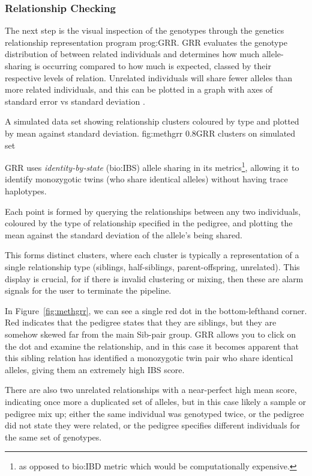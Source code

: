 \subsubsection{Relationship Checking}

The next step is the visual inspection of the genotypes through the genetics relationship representation program \gls{prog:GRR}. GRR evaluates the genotype distribution of between related individuals and determines how much allele-sharing is occurring compared to how much is expected, classed by their respective levels of relation. Unrelated individuals will share fewer alleles than more related individuals, and this can be plotted in a graph with axes of standard error vs standard deviation \cite{grr}.

{A simulated data set showing relationship clusters coloured by type and plotted by mean against standard deviation.}
{fig:methgrr}
{0.8}{GRR clusters on simulated set}

GRR uses \textit{identity-by-state} (\gls{bio:IBS}) allele sharing in its metrics\footnote{as opposed to \gls{bio:IBD} metric which would be computationally expensive.}, allowing it to identify monozygotic twins (who share identical alleles) without having trace haplotypes.

Each point is formed by querying the relationships between any two individuals, coloured by the type of relationship specified in the pedigree, and plotting the mean against the standard deviation of the allele's being shared.

This forms distinct clusters, where each cluster is typically a representation of a single relationship type (siblings, half-siblings, parent-offspring, unrelated). This display is crucial, for if there is invalid clustering or mixing, then these are alarm signals for the user to terminate the pipeline.

In Figure~\ref{fig:methgrr}, we can see a single red dot in the bottom-lefthand corner. Red indicates that the pedigree states that they are siblings, but they are somehow skewed far from the main Sib-pair group. GRR allows you to click on the dot and examine the relationship, and in this case it becomes apparent that this sibling relation has identified a monozygotic twin pair who share identical alleles, giving them an extremely high IBS score.

There are also two unrelated relationships with a near-perfect high mean score, indicating once more a duplicated set of alleles, but in this case likely a sample or pedigree mix up; either the same individual was genotyped twice, or the pedigree did not state they were related, or the pedigree specifies different individuals for the same set of genotypes.


